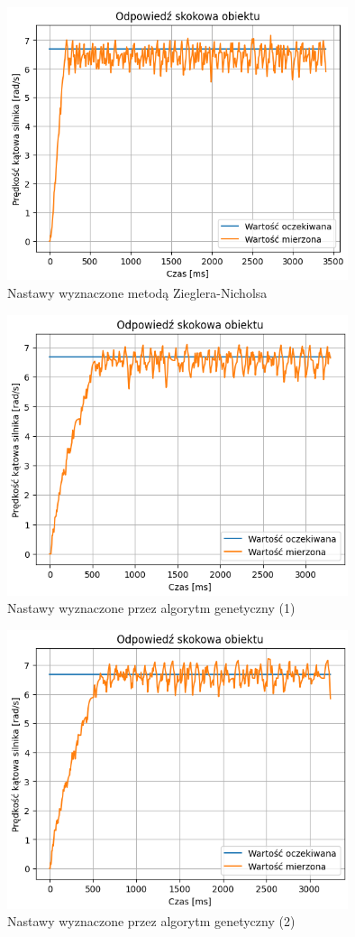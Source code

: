 \documentclass[12pt,twoside]{article}
\begin{document}
\newpage

\begin{figure}[ht]%
 \centering%
 \includegraphics[width=10cm]{figures/PID/zieglerpid.png}%
 \caption{Nastawy wyznaczone metodą Zieglera-Nicholsa}%
 \label{Fig:zieglerpid}%
\end{figure}

\begin{figure}[ht]%
 \centering%
 \includegraphics[width=10cm]{figures/PID/exp1pid.png}%
 \caption{Nastawy wyznaczone przez algorytm genetyczny (1)}%
 \label{Fig:exp1pid}%
\end{figure}

\begin{figure}[ht]%
 \centering%
 \includegraphics[width=10cm]{figures/PID/exp2pid.png}%
 \caption{Nastawy wyznaczone przez algorytm genetyczny (2)}%
 \label{Fig:exp2pid}%
\end{figure}
\end{document}
